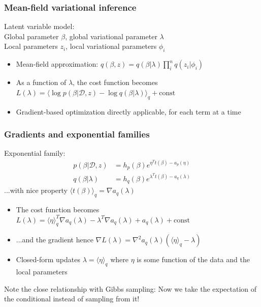 \documentclass{beamer}
\newcommand{\dataset}{\mathcal{D}}
\begin{document}
\begin{frame}
  \frametitle{Mean-field variational inference}

  Latent variable model:\\
  Global parameter $\beta$, global variational parameter $\lambda$\\
  Local parameters $z_i$, local variational parameters $\phi_i$

  \begin{itemize}
    \item Mean-field approximation:
      $q(\beta,z) = q(\beta|\lambda) \prod_{i}^n q(z_i|\phi_i)$
    \item As a function of $\lambda$, the cost function becomes
      $L(\lambda) = \langle \log p(\beta|\dataset,z)
      - \log q(\beta|\lambda)\rangle_{q} + \text{const}$
    \item Gradient-based optimization directly applicable, for each
      term at a time
  \end{itemize}
\end{frame}

\begin{frame}
  \frametitle{Gradients and exponential families}

  Exponential family:
  \begin{align*}
  p(\beta|\dataset,z) &= h_p(\beta) e^{\eta^T t(\beta) - a_p(\eta)} \\
  q(\beta|\lambda) &= h_q(\beta) e^{\lambda^T t(\beta) - a_q(\lambda)}
  \end{align*}
  ...with nice property $\langle t(\beta) \rangle_q = \nabla a_q(\lambda)$

  \begin{itemize}
    \item The cost function becomes
      $L(\lambda) = \langle \eta \rangle^T_q \nabla a_q(\lambda)
      - \lambda^T \nabla a_q(\lambda) + a_q(\lambda) + \text{const}$
    \item ...and the gradient hence
      $\nabla L(\lambda) = \nabla^2 a_q(\lambda)
      (\langle \eta \rangle_q - \lambda)$
    \item Closed-form updates $\lambda = \langle \eta \rangle_q$
      where $\eta$ is some function of the data and the local
      parameters
  \end{itemize}
  Note the close relationship with Gibbs sampling: Now we take the
  expectation of the conditional instead of sampling from it!
\end{frame}
\end{document}
